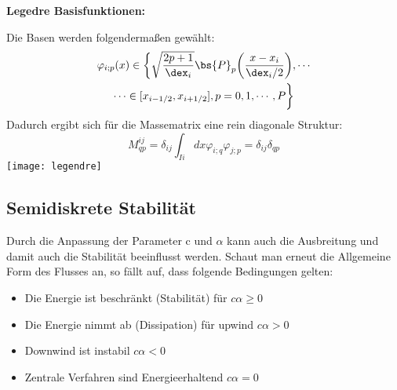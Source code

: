 \textbf{Legedre Basisfunktionen:}
\begin{multicols}{2}
	\vspace{-2em}
	Die Basen werden folgenderma\ss{}en gew\"ahlt:
	\begin{multline*}
		\varphi_{i;p}(x)\in\bigg{\{} \sqrt{\frac{2p + 1}{\dex_i}} \bs{P}_p\bigg(\frac{x-x_i}{\dex_i/2}\bigg),\cdots \\ \cdots \in[x_{i-1/2}, x_{i+1/2}], p=0,1,\cdots,P \bigg{\}}
	\end{multline*}
	Dadurch ergibt sich f\"ur die Massematrix eine rein diagonale Struktur:
	\begin{equation*}
		M^{ij}_{qp} = \delta_{ij}\int_{Ii}dx\varphi_{i;q}\varphi_{j;p} = \delta_{ij}\delta_{qp}
	\end{equation*}
\vfill\null
\columnbreak
	\texttt{[image: legendre]}
\end{multicols}

\subsection{Semidiskrete Stabilit\"at}
Durch die Anpassung der Parameter c und $\alpha$ kann auch die Ausbreitung und damit auch die Stabilit\"at beeinflusst werden. Schaut man erneut die Allgemeine Form des Flusses an, so f\"allt auf, dass folgende Bedingungen gelten:
\begin{itemize}
	\item Die Energie ist beschr\"ankt (Stabilit\"at) f\"ur $c\alpha\geq0$
	\item Die Energie nimmt ab (Dissipation) f\"ur upwind $c\alpha>0$
	\item Downwind ist instabil $c\alpha<0$
	\item Zentrale Verfahren sind Energieerhaltend $c\alpha=0$
\end{itemize}

